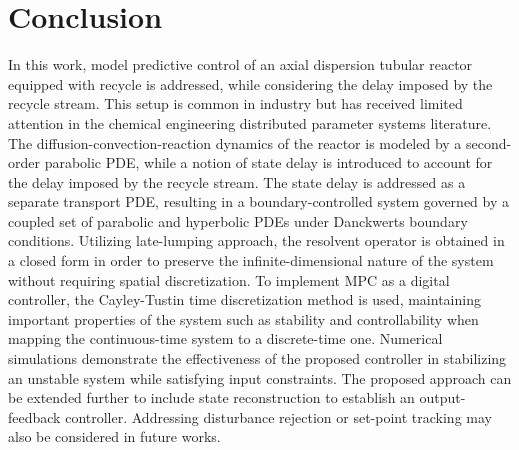 \section{Conclusion}

In this work, model predictive control of an axial dispersion tubular reactor equipped with recycle is addressed, while considering the delay imposed by the recycle stream. This setup is common in industry but has received limited attention in the chemical engineering distributed parameter systems literature. The diffusion-convection-reaction dynamics of the reactor is modeled by a second-order parabolic PDE, while a notion of state delay is introduced to account for the delay imposed by the recycle stream. The state delay is addressed as a separate transport PDE, resulting in a boundary-controlled system governed by a coupled set of parabolic and hyperbolic PDEs under Danckwerts boundary conditions. Utilizing late-lumping approach, the resolvent operator is obtained in a closed form in order to preserve the infinite-dimensional nature of the system without requiring spatial discretization. To implement MPC as a digital controller, the Cayley-Tustin time discretization method is used, maintaining important properties of the system such as stability and controllability when mapping the continuous-time system to a discrete-time one. Numerical simulations demonstrate the effectiveness of the proposed controller in stabilizing an unstable system while satisfying input constraints. The proposed approach can be extended further to include state reconstruction to establish an output-feedback controller. Addressing disturbance rejection or set-point tracking may also be considered in future works.